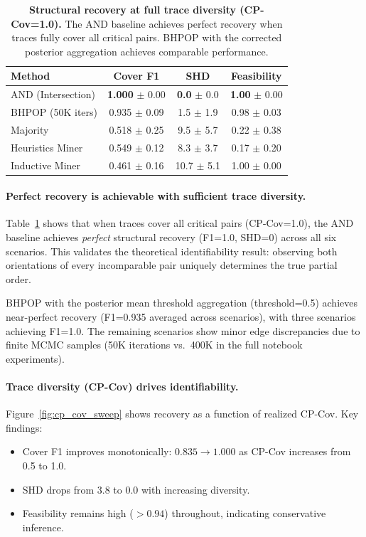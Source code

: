 \begin{table}[t]
\centering
\caption{\textbf{Structural recovery at full trace diversity (CP-Cov=1.0).} The AND baseline achieves perfect recovery when traces fully cover all critical pairs. BHPOP with the corrected posterior aggregation achieves comparable performance.}
\label{tab:recovery_cpcov_1}
\small
\begin{tabular}{lccc}
\toprule
\textbf{Method} & \textbf{Cover F1} & \textbf{SHD} & \textbf{Feasibility} \\
\midrule
AND (Intersection) & \textbf{1.000} $\pm$ 0.00 & \textbf{0.0} $\pm$ 0.0 & \textbf{1.00} $\pm$ 0.00 \\
BHPOP (50K iters) & 0.935 $\pm$ 0.09 & 1.5 $\pm$ 1.9 & 0.98 $\pm$ 0.03 \\
Majority & 0.518 $\pm$ 0.25 & 9.5 $\pm$ 5.7 & 0.22 $\pm$ 0.38 \\
Heuristics Miner & 0.549 $\pm$ 0.12 & 8.3 $\pm$ 3.7 & 0.17 $\pm$ 0.20 \\
Inductive Miner & 0.461 $\pm$ 0.16 & 10.7 $\pm$ 5.1 & 1.00 $\pm$ 0.00 \\
\bottomrule
\end{tabular}
\end{table}

\paragraph{Perfect recovery is achievable with sufficient trace diversity.}
Table~\ref{tab:recovery_cpcov_1} shows that when traces cover all critical pairs (CP-Cov=1.0), the AND baseline achieves \emph{perfect} structural recovery (F1=1.0, SHD=0) across all six scenarios. This validates the theoretical identifiability result: observing both orientations of every incomparable pair uniquely determines the true partial order.

BHPOP with the posterior mean threshold aggregation (threshold=0.5) achieves near-perfect recovery (F1=0.935 averaged across scenarios), with three scenarios achieving F1=1.0. The remaining scenarios show minor edge discrepancies due to finite MCMC samples (50K iterations vs.\ 400K in the full notebook experiments).

\paragraph{Trace diversity (CP-Cov) drives identifiability.}
Figure~\ref{fig:cp_cov_sweep} shows recovery as a function of realized CP-Cov. Key findings:
\begin{itemize}[nosep,leftmargin=*]
    \item Cover F1 improves monotonically: $0.835 \to 1.000$ as CP-Cov increases from 0.5 to 1.0.
    \item SHD drops from 3.8 to 0.0 with increasing diversity.
    \item Feasibility remains high ($>0.94$) throughout, indicating conservative inference.
\end{itemize}

